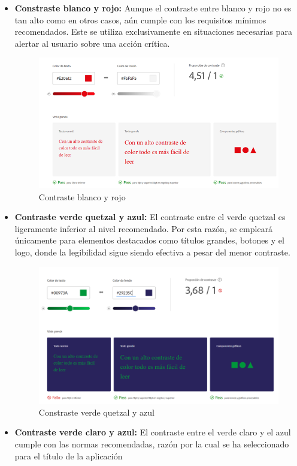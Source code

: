 \begin{itemize}
    
    \item \textbf{Constraste blanco y rojo:}  Aunque el contraste entre blanco y rojo no es tan alto como en otros casos, aún cumple con los requisitos mínimos recomendados. Este se utiliza exclusivamente en situaciones necesarias para alertar al usuario sobre una acción crítica.

    \begin{figure} [H]
        \centering
        \includegraphics[width=0.6\linewidth]{figuras/contraste_blanco_rojo.png}
        \caption{Contraste blanco y rojo}
        \label{fig:enter-label}
    \end{figure}
    
    \item \textbf{Contraste verde quetzal y azul:} El contraste entre el verde quetzal es ligeramente inferior al nivel recomendado. Por esta razón, se empleará únicamente para elementos destacados como títulos grandes, botones y el logo, donde la legibilidad sigue siendo efectiva a pesar del menor contraste. 
   
    \begin{figure} [H]
        \centering
        \includegraphics[width=0.6\linewidth]{figuras/contraste_azul_verde.png}
        \caption{Constraste verde quetzal y azul}
        \label{fig:enter-label}
    \end{figure}

    \item \textbf{Contraste verde claro y azul:} El contraste entre el verde claro y el azul cumple con las normas recomendadas, razón por la cual se ha seleccionado para el título de la aplicación
    

\end{itemize}
